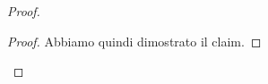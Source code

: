 \begin{proof}
\begin{proof}



        Abbiamo quindi dimostrato il claim.
    \end{proof}


\end{proof}
